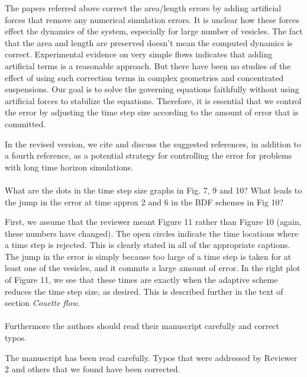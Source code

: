 \documentclass[12pt]{article}
\newcommand{\comment}[1]{{\color{blue} #1}}
\begin{document}
The papers referred above correct the area/length errors by adding
artificial forces that remove any numerical simulation errors. It is
unclear how these forces effect the dynamics of the system, especially
for large number of vesicles. The fact that the area and length are
preserved doesn't mean the computed dynamics is correct. Experimental
evidence on very simple flows indicates that adding artificial terms
is a reasonable approach. But there have been no studies of the effect
of using such correction terms in complex geometries and concentrated
suspensions.  Our goal is to solve the governing equations faithfully
without using artificial forces to stabilize the equations.
Therefore, it is essential that we control the error by adjusting the
time step size according to the amount of error that is committed.

In the revised version, we cite and discuss the suggested references,
in addition to a fourth reference, as a potential strategy for
controlling the error for problems with long time horizon
simulations.\\ \\

 \comment{What are the dots in the time step size graphs in Fig. 7,
   9 and 10? What leads to the jump in the error at time approx 2 and
   6 in the BDF schemes in Fig 10?}

First, we assume that the reviewer meant Figure 11 rather than Figure 10
(again, these numbers have changed).  The open circles indicate the time
locations where a time step is rejected.  This is clearly stated in all
of the appropriate captions.  The jump in the error is simply because
too large of a time step is taken for at least one of the vesicles, and
it commits a large amount of error.  In the right plot of Figure 11, we
see that these times are exactly when the adaptive scheme reduces the
time step size, as desired.  This is described further in the text of
section {\em Couette flow}. \\ \\
\comment{Furthermore the authors should read their manuscript carefully
and correct typos.}

The manuscript has been read carefully.  Typos that were addressed by
Reviewer 2 and others that we found have been corrected. \\ \\

\end{document}
